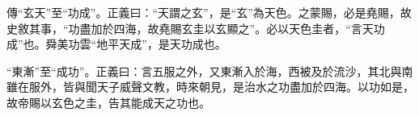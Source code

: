 {\noindent\zhuan{}\fzbyks 傳“玄天”至“功成”。正義曰：“天謂之玄”，是“玄”為天色。之蒙賜，必是堯賜，故史敘其事，“功盡加於四海，故堯賜玄圭以玄顯之”。必以天色圭者，“言天功成”也。舜美功雲“地平天成”，是天功成也。 \par}

{\noindent\shu{}\fzkt “東漸”至“成功”。正義曰：言五服之外，又東漸入於海，西被及於流沙，其北與南雖在服外，皆與聞天子威聲文教，時來朝見，是治水之功盡加於四海。以功如是，故帝賜以玄色之圭，告其能成天之功也。 \par}

